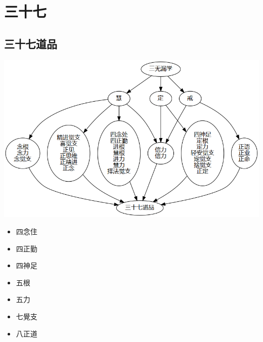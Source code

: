 \section{三十七}

\subsection{三十七道品}
\includegraphics[scale=0.5]{释家/images/三十七道品.png}
\begin{itemize}
  \item 四念住
  \item 四正勤
  \item 四神足
  \item 五根
  \item 五力
  \item 七覺支
  \item 八正道
\end{itemize}
